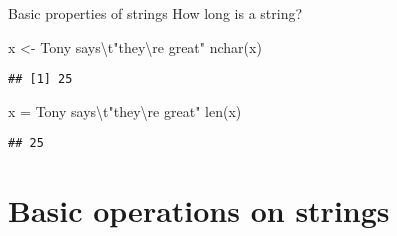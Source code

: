 \documentclass[
  10pt,
  ignorenonframetext,
  aspectratio=169]{beamer}
\newenvironment{Shaded}{\begin{snugshade}}{\end{snugshade}}
\newcommand{\BuiltInTok}[1]{\textcolor[rgb]{0.80,0.80,0.80}{#1}}
\newcommand{\CharTok}[1]{\textcolor[rgb]{0.86,0.64,0.64}{#1}}
\newcommand{\FunctionTok}[1]{\textcolor[rgb]{0.94,0.94,0.56}{#1}}
\newcommand{\NormalTok}[1]{\textcolor[rgb]{0.80,0.80,0.80}{#1}}
\newcommand{\OperatorTok}[1]{\textcolor[rgb]{0.94,0.94,0.82}{#1}}
\newcommand{\OtherTok}[1]{\textcolor[rgb]{0.94,0.94,0.56}{#1}}
\newcommand{\SpecialCharTok}[1]{\textcolor[rgb]{0.86,0.64,0.64}{#1}}
\newcommand{\StringTok}[1]{\textcolor[rgb]{0.80,0.58,0.58}{#1}}
\begin{document}
\begin{frame}[fragile]{Basic properties of strings}
\protect\hypertarget{basic-properties-of-strings}{}
How long is a string?

\begin{Shaded}
\begin{Highlighting}[]
\NormalTok{x }\OtherTok{\textless{}{-}} \StringTok{\textquotesingle{}Tony says}\SpecialCharTok{\textbackslash{}t}\StringTok{"they}\SpecialCharTok{\textbackslash{}\textquotesingle{}}\StringTok{re great"\textquotesingle{}}
\FunctionTok{nchar}\NormalTok{(x)}
\end{Highlighting}
\end{Shaded}

\begin{verbatim}
## [1] 25
\end{verbatim}

\begin{Shaded}
\begin{Highlighting}[]
\NormalTok{x }\OperatorTok{=} \StringTok{\textquotesingle{}Tony says}\CharTok{\textbackslash{}t}\StringTok{"they}\CharTok{\textbackslash{}\textquotesingle{}}\StringTok{re great"\textquotesingle{}}
\BuiltInTok{len}\NormalTok{(x)}
\end{Highlighting}
\end{Shaded}

\begin{verbatim}
## 25
\end{verbatim}
\end{frame}

\hypertarget{basic-operations-on-strings}{%
\section{Basic operations on
strings}\label{basic-operations-on-strings}}
\end{document}
